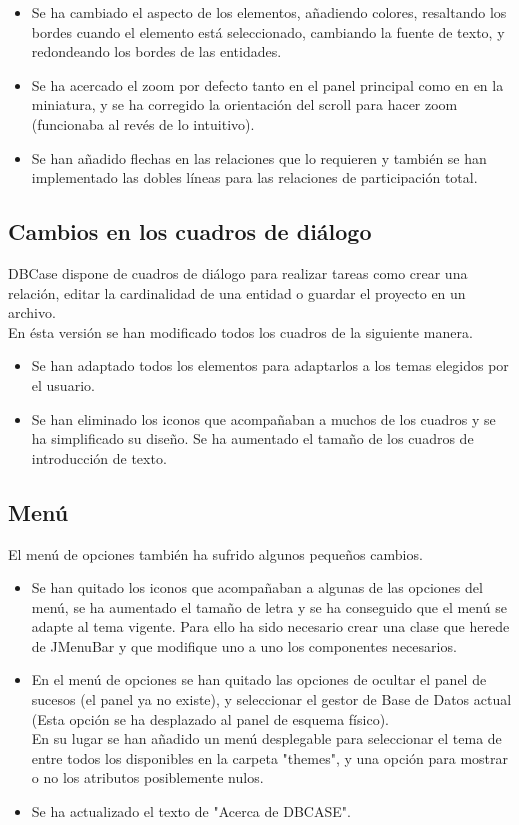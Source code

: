 \begin{itemize}
    \item Se ha cambiado el aspecto de los elementos, añadiendo colores, resaltando los bordes cuando el elemento está seleccionado, cambiando la fuente de texto, y redondeando los bordes de las entidades.
    \item Se ha acercado el zoom por defecto tanto en el panel principal como en en la miniatura, y se ha corregido la orientación del scroll para hacer zoom (funcionaba al revés de lo intuitivo).
    \item Se han añadido flechas en las relaciones que lo requieren y también se han implementado las dobles líneas para las relaciones de participación total.
\end{itemize}
\subsection{Cambios en los cuadros de diálogo}
DBCase dispone de cuadros de diálogo para realizar tareas como crear una relación, editar la cardinalidad de una entidad o guardar el proyecto en un archivo.\\

En ésta versión se han modificado todos los cuadros de la siguiente manera.
\begin{itemize}
    \item Se han adaptado todos los elementos para adaptarlos a los temas elegidos por el usuario.
    \item Se han eliminado los iconos que acompañaban a muchos de los cuadros y se ha simplificado su diseño. Se ha aumentado el tamaño de los cuadros de introducción de texto.
\end{itemize}
\subsection{Menú}
El menú de opciones también ha sufrido algunos pequeños cambios.
\begin{itemize}
    \item Se han quitado los iconos que acompañaban a algunas de las opciones del menú, se ha aumentado el tamaño de letra y se ha conseguido que el menú se adapte al tema vigente. Para ello ha sido necesario crear una clase que herede de JMenuBar \cite{menu} y que modifique uno a uno los componentes necesarios.
    \item En el menú de opciones se han quitado las opciones de ocultar el panel de sucesos (el panel ya no existe), y seleccionar el gestor de Base de Datos actual (Esta opción se ha desplazado al panel de esquema físico).\\
    
    En su lugar se han añadido un menú desplegable para seleccionar el tema de entre todos los disponibles en la carpeta "themes", y una opción para mostrar o no los atributos posiblemente nulos.
    
    \item Se ha actualizado el texto de "Acerca de DBCASE".
\end{itemize}
